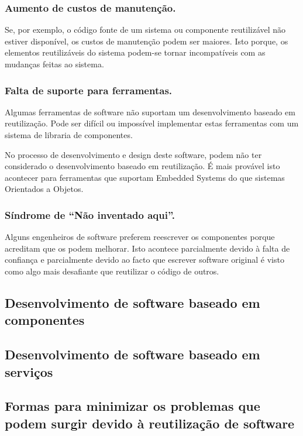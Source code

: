 \documentclass[runningheads]{llncs}
\begin{document}
\subsubsection{Aumento de custos de manutenção.}

Se, por exemplo, o código fonte de um sistema ou componente reutilizável não estiver disponível, os custos de manutenção podem ser maiores. Isto porque, os elementos reutilizáveis do sistema podem-se tornar incompatíveis com as mudanças feitas ao sistema.

\subsubsection{Falta de suporte para ferramentas.}

Algumas ferramentas de software não suportam um desenvolvimento baseado em reutilização. Pode ser difícil ou impossível implementar estas ferramentas com um sistema de libraria de componentes. \par
No processo de desenvolvimento e design deste software, podem não ter considerado o desenvolvimento baseado em reutilização. É mais provável isto acontecer para ferramentas que suportam Embedded Systems do que sistemas Orientados a Objetos.

\subsubsection{Síndrome de “Não inventado aqui”.}

Alguns engenheiros de software preferem reescrever os componentes porque acreditam que os podem melhorar. Isto acontece parcialmente devido à falta de confiança e parcialmente devido ao facto que escrever software original é visto como algo mais desafiante que reutilizar o código de outros.

\subsection{Desenvolvimento de software baseado em componentes}


\subsection{Desenvolvimento de software baseado em serviços}



\subsection{Formas para minimizar os problemas que podem surgir devido à reutilização de software}
\end{document}
